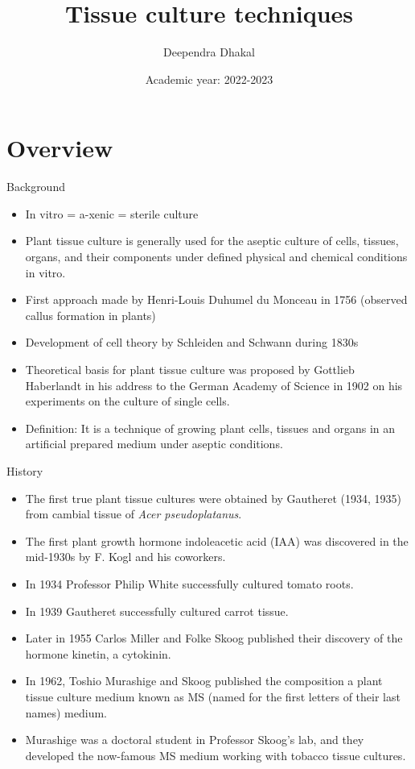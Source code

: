 \documentclass[
  ignorenonframetext,
  aspectratio=169]{beamer}
\title{Tissue culture techniques}
\author{Deependra Dhakal}
\date{Academic year: 2022-2023}
\institute{College of Natural Resource Management, Tikapur,
Kailali \and Agriculture and Forestry University}
\providecommand{\tightlist}{%
  \setlength{\itemsep}{0pt}\setlength{\parskip}{0pt}}
\begin{document}
\frame{\titlepage}

\begin{frame}[allowframebreaks]
  \tableofcontents[hideallsubsections]
\end{frame}
\hypertarget{overview}{%
\section{Overview}\label{overview}}

\begin{frame}{Background}
\protect\hypertarget{background}{}
\begin{itemize}
\tightlist
\item
  In vitro = a-xenic = sterile culture
\item
  Plant tissue culture is generally used for the aseptic culture of
  cells, tissues, organs, and their components under defined physical
  and chemical conditions in vitro.
\item
  First approach made by Henri-Louis Duhumel du Monceau in 1756
  (observed callus formation in plants)
\item
  Development of cell theory by Schleiden and Schwann during 1830s
\item
  Theoretical basis for plant tissue culture was proposed by Gottlieb
  Haberlandt in his address to the German Academy of Science in 1902 on
  his experiments on the culture of single cells.
\item
  Definition: It is a technique of growing plant cells, tissues and
  organs in an artificial prepared medium under aseptic conditions.
\end{itemize}
\end{frame}

\begin{frame}{History}
\protect\hypertarget{history}{}
\begin{itemize}
\tightlist
\item
  The first true plant tissue cultures were obtained by Gautheret (1934,
  1935) from cambial tissue of \emph{Acer pseudoplatanus}.
\item
  The first plant growth hormone indoleacetic acid (IAA) was discovered
  in the mid-1930s by F. Kogl and his coworkers.
\item
  In 1934 Professor Philip White successfully cultured tomato roots.
\item
  In 1939 Gautheret successfully cultured carrot tissue.
\item
  Later in 1955 Carlos Miller and Folke Skoog published their discovery
  of the hormone kinetin, a cytokinin.
\item
  In 1962, Toshio Murashige and Skoog published the composition a plant
  tissue culture medium known as MS (named for the first letters of
  their last names) medium.
\item
  Murashige was a doctoral student in Professor Skoog's lab, and they
  developed the now-famous MS medium working with tobacco tissue
  cultures.
\end{itemize}
\end{frame}
\end{document}
